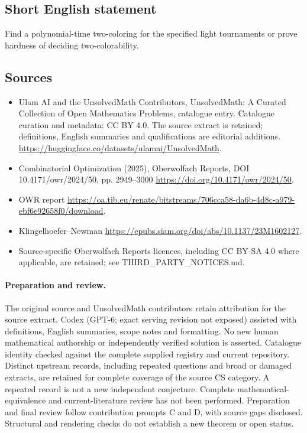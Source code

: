 \documentclass[11pt]{article}
\begin{document}
\subsection{Short English statement}
Find a polynomial-time two-coloring for the specified light tournaments or prove hardness of deciding two-colorability.
\subsection{Sources}
\begin{itemize}
\item[\hypertarget{source:statement:1}{S1}] Ulam AI and the UnsolvedMath Contributors, UnsolvedMath: A Curated Collection of Open Mathematics Problems, catalogue entry. Catalogue curation and metadata: CC BY 4.0. The source extract is retained; definitions, English summaries and qualifications are editorial additions.
\url{https://huggingface.co/datasets/ulamai/UnsolvedMath}.
\item[\hypertarget{source:statement:2}{S2}] Combinatorial Optimization (2025), Oberwolfach Reports, DOI 10.4171/owr/2024/50, pp. 2949--3000
\url{https://doi.org/10.4171/owr/2024/50}.
\item[\hypertarget{source:statement:3}{S3}] OWR report
\url{https://oa.tib.eu/renate/bitstreams/706cca58-da6b-4d8c-a979-ebf6e92658f0/download}.
\item[\hypertarget{source:statement:4}{S4}] Klingelhoefer--Newman
\url{https://epubs.siam.org/doi/abs/10.1137/23M1602127}.
\item Source-specific Oberwolfach Reports licences, including CC BY-SA 4.0 where applicable, are retained; see THIRD\_PARTY\_NOTICES.md.
\end{itemize}
\paragraph{Preparation and review.}
The original source and UnsolvedMath contributors retain attribution for the source extract. Codex (GPT-6; exact serving revision not exposed) assisted with definitions, English summaries, scope notes and formatting. No new human mathematical authorship or independently verified solution is asserted. Catalogue identity checked against the complete supplied registry and current repository. Distinct upstream records, including repeated questions and broad or damaged extracts, are retained for complete coverage of the source CS category. A repeated record is not a new independent conjecture. Complete mathematical-equivalence and current-literature review has not been performed. Preparation and final review follow contribution prompts C and D, with source gaps disclosed. Structural and rendering checks do not establish a new theorem or open status.
\label{end:statement}
\end{document}
